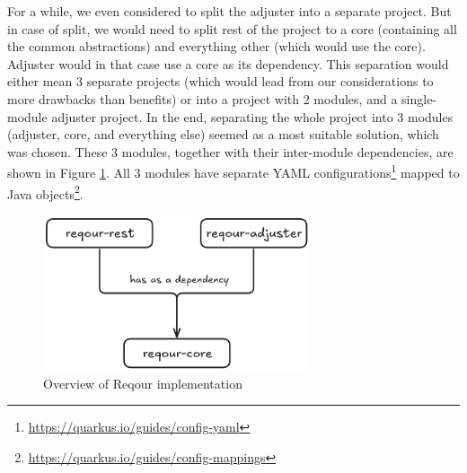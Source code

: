 \documentclass[../main.tex]{subfiles}
\begin{document}
For a while, we even considered to split the adjuster into a separate project. But in case of split, we would need to split rest of the project to a core (containing all the common abstractions) and everything other (which would use the core). Adjuster would in that case use a core as its dependency. This separation would either mean 3 separate projects (which would lead from our considerations to more drawbacks than benefits) or into a project with 2 modules, and a single-module adjuster project. In the end, separating the whole project into 3 modules (adjuster, core, and everything else) seemed as a most suitable solution, which was chosen. These 3 modules, together with their inter-module dependencies, are shown in Figure \ref{fig:reqour-modules}. All 3 modules have separate YAML configurations\footnote{\url{https://quarkus.io/guides/config-yaml}} mapped to Java objects\footnote{\url{https://quarkus.io/guides/config-mappings}}.

\begin{figure}
  \begin{center}
    \includegraphics[width=0.7\textwidth]{images/reqour-modules.png}
  \end{center}
  \caption{Overview of Reqour implementation}
  \label{fig:reqour-modules}
\end{figure}
\end{document}
